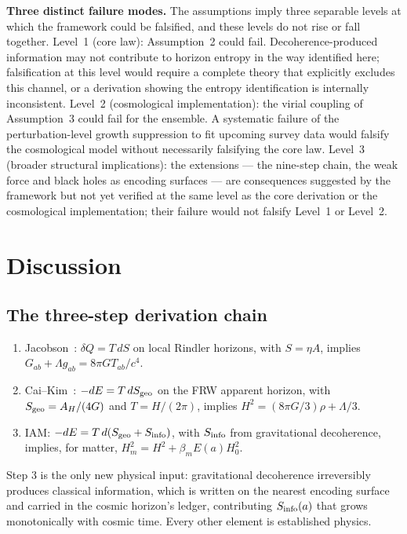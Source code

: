 \textbf{Three distinct failure modes.} The assumptions imply three separable levels at which the framework could be falsified, and these levels do not
rise or fall together. Level~1 (core law): Assumption~2 could fail. Decoherence-produced information may not contribute to horizon entropy in the way
identified here; falsification at this level would require a complete theory that explicitly excludes this channel, or a derivation showing the entropy
identification is internally inconsistent. Level~2 (cosmological implementation): the virial coupling of Assumption~3 could fail for the ensemble. A
systematic failure of the perturbation-level growth suppression to fit upcoming survey data would falsify the cosmological model without necessarily
falsifying the core law. Level~3 (broader structural implications): the extensions --- the nine-step chain, the weak force and black holes as encoding surfaces --- are
consequences suggested by the framework but not yet verified at the same level as the core derivation or the cosmological implementation; their failure
would not falsify Level~1 or Level~2.

\section{Discussion}
\subsection{The three-step derivation chain}
\begin{enumerate}
\item Jacobson~\cite{Jacobson1995}: $\delta Q=T\,dS$ on local Rindler horizons, with $S=\eta A$, implies $G_{ab}+\Lambda g_{ab}=8\pi GT_{ab}/c^4$.
\item Cai--Kim~\cite{CaiKim2005}: $-dE=T\,dS_{\rm geo}$ on the FRW apparent horizon, with $S_{\rm geo}=A_H/(4G)$ and $T=H/(2\pi)$, implies
$H^2=(8\pi G/3)\rho+\Lambda/3$.
\item IAM: $-dE=T\,d(S_{\rm geo}+S_{\rm info})$, with $S_{\rm info}$ from gravitational decoherence, implies, for matter, $H_m^2=H^2+\beta_mE(a)H_0^2$.
\end{enumerate}
Step 3 is the only new physical input: gravitational decoherence irreversibly produces classical information, which is written on the nearest encoding surface and carried in the cosmic
horizon's ledger, contributing $S_{\rm info}(a)$ that grows monotonically with cosmic time. Every other element is established physics.

